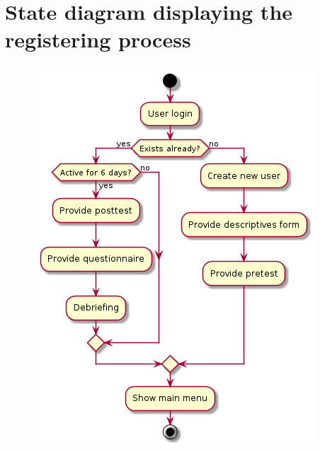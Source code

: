 \chapter{State diagram displaying the registering process}
\label{app:registering}
\begin{figure}[h!]
\centering
\includegraphics[width=\textwidth]{img/registering.png}
\end{figure}
